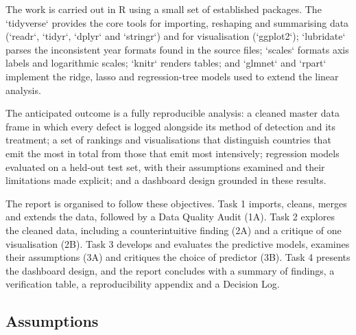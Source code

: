 \documentclass[
]{article}
\begin{document}
The work is carried out in R using a small set of established packages.
The `tidyverse` provides the core tools for importing, reshaping and
summarising data (`readr`, `tidyr`, `dplyr` and `stringr`) and for
visualisation (`ggplot2`); `lubridate` parses the inconsistent year
formats found in the source files; `scales` formats axis labels and
logarithmic scales; `knitr` renders tables; and `glmnet` and `rpart`
implement the ridge, lasso and regression-tree models used to extend the
linear analysis.

The anticipated outcome is a fully reproducible analysis: a cleaned
master data frame in which every defect is logged alongside its method
of detection and its treatment; a set of rankings and visualisations
that distinguish countries that emit the most in total from those that
emit most intensively; regression models evaluated on a held-out test
set, with their assumptions examined and their limitations made
explicit; and a dashboard design grounded in these results.

The report is organised to follow these objectives. Task 1 imports,
cleans, merges and extends the data, followed by a Data Quality Audit
(1A). Task 2 explores the cleaned data, including a counterintuitive
finding (2A) and a critique of one visualisation (2B). Task 3 develops
and evaluates the predictive models, examines their assumptions (3A) and
critiques the choice of predictor (3B). Task 4 presents the dashboard
design, and the report concludes with a summary of findings, a
verification table, a reproducibility appendix and a Decision Log.

\subsection{Assumptions}\label{assumptions}
\end{document}
